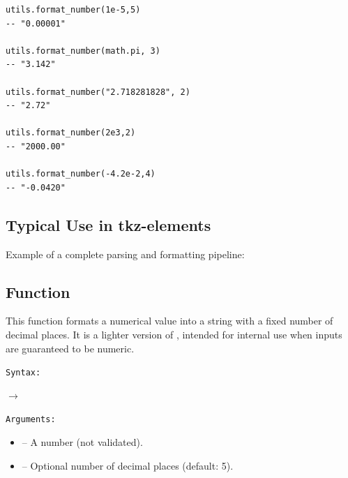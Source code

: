 \begin{verbatim}
utils.format_number(1e-5,5)
-- "0.00001"

utils.format_number(math.pi, 3)
-- "3.142"

utils.format_number("2.718281828", 2)
-- "2.72"

utils.format_number(2e3,2)
-- "2000.00"

utils.format_number(-4.2e-2,4)
-- "-0.0420"
\end{verbatim}


\subsection{Typical Use in tkz-elements}

Example of a complete parsing and formatting pipeline:

\begin{tkzexample}[latex=.4\textwidth]
\end{tkzexample}



\subsection{Function }
\label{sub:function_utils_format_coord}

This function formats a numerical value into a string with a fixed number of decimal places. It is a lighter version of , intended for internal use when inputs are guaranteed to be numeric.

\texttt{Syntax: }

\begin{center}
 \hfill $\rightarrow$ 
\end{center}

\texttt{Arguments: }

\begin{itemize}
\item {} – A number (not validated).
\item {} – Optional number of decimal places (default: 5).
\end{itemize}

